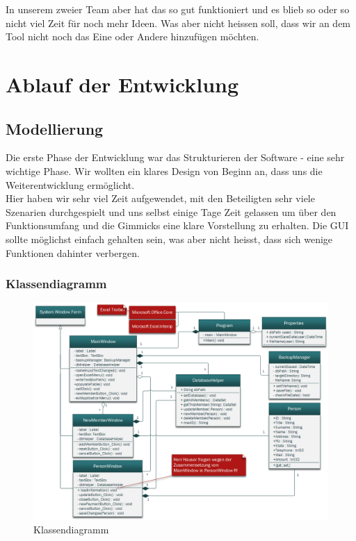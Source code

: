 \documentclass{article}
\begin{document}
In unserem zweier Team aber hat das so gut funktioniert und es blieb so oder so nicht viel Zeit für noch mehr Ideen. Was aber nicht heissen soll, dass wir an dem Tool nicht noch das Eine oder Andere hinzufügen möchten.

\newpage


\section{Ablauf der Entwicklung}

\subsection{Modellierung}
Die erste Phase der Entwicklung war das Strukturieren der Software - eine sehr wichtige Phase. Wir wollten ein klares Design von Beginn an, dass uns die Weiterentwicklung ermöglicht.\\
Hier haben wir sehr viel Zeit aufgewendet, mit den Beteiligten sehr viele Szenarien durchgespielt und uns selbst einige Tage Zeit gelassen um über den Funktionsumfang und die Gimmicks eine klare Vorstellung zu erhalten. Die GUI sollte möglichst einfach gehalten sein, was aber nicht heisst, dass sich wenige Funktionen dahinter verbergen. 

\subsubsection{Klassendiagramm}
	
\begin{figure}[h]
	\centering
	\includegraphics[width=1.05 \textwidth]{KlassendiagrammBild}
	\caption{Klassendiagramm}
\end{figure}
\end{document}
